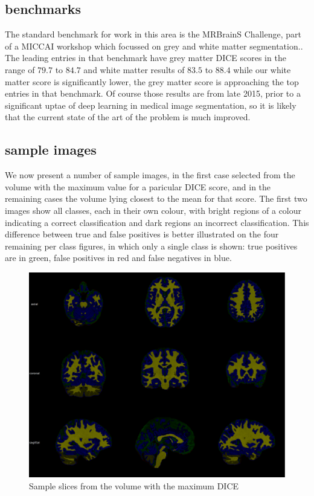 \documentclass[msc]{infthesis}
\begin{document}
\subsection{benchmarks}
%
The standard benchmark for work in this area is the MRBrainS Challenge, part of a MICCAI workshop
which focussed on grey and white matter segmentation.\cite{mendrik2015mrbrains}.  The leading
entries in that benchmark have grey matter DICE scores in the range of \(79.7\) to \(84.7\) and
white matter results of \(83.5\) to \(88.4\) while our white matter score is significantly lower,
the grey matter score is approaching the top entries in that benchmark.  Of course those results
are from late 2015, prior to a significant uptae of deep learning in medical image segmentation,
so it is likely that the current  state of the art of the problem is much improved.


\subsection{sample images}

We now present a number of sample images, in the first case selected from the volume with the
maximum value for a paricular DICE score, and in the remaining cases the volume lying closest to
the mean for that score.  The first two images show all classes, each in their own colour, with
bright regions of a colour indicating a correct classification and dark regions an incorrect
classification.  This difference between true and false positives is better illustrated on the
four remaining per class figures, in which only a single class is shown: true positives are in
green, false positives in red and false negatives in blue.

\begin{figure}[ht]
  \centering
  \includegraphics[width=\textwidth]{images/overall_max}
  \caption{Sample slices from the volume with the maximum DICE}
  \label{fig:overall-max-dice}
\end{figure}
\end{document}
